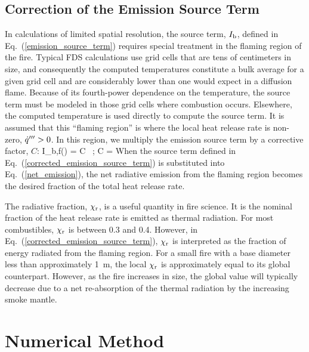 \subsection{Correction of the Emission Source Term}

In calculations of limited spatial resolution, the source term, $I_{\rm b}$,
defined in Eq.~(\ref{emission_source_term}) requires special treatment in the flaming region of the fire. Typical FDS calculations
use grid cells that are tens of centimeters in size, and consequently the computed temperatures constitute a bulk average for a given grid cell and are considerably lower than
one would expect in a diffusion flame.
Because of its fourth-power dependence on the temperature,
the source term must be modeled in those grid cells where combustion occurs. Elsewhere, the computed temperature is used directly to compute the source term.
It is assumed that this ``flaming region'' is where the local heat release rate is non-zero, $\dot{q}'''>0$. In this region, we
multiply the emission source term by a corrective factor, $C$:
\be I_{\rm b,f}(\bx) = C \,    \quad ; \quad
    C =  \label{corrected_emission_source_term}
\ee
When the source term defined in Eq.~(\ref{corrected_emission_source_term}) is
substituted into Eq.~(\ref{net_emission}), the net radiative emission from the flaming region becomes the desired fraction of the total heat release rate.

The radiative
fraction, $\chi_{\rm r}$, is a useful quantity in fire science. It is the nominal fraction of the heat release rate is emitted as thermal radiation. For most combustibles, $\chi_{\rm r}$
is between 0.3 and 0.4. However, in Eq.~(\ref{corrected_emission_source_term}), $\chi_{\rm r}$ is
interpreted as the fraction of energy radiated from the flaming
region.  For a small fire with a base diameter less than approximately 1~m, the local $\chi_{\rm r}$ is
approximately equal to its global counterpart. However, as the fire
increases in size, the global value will typically decrease due to a
net re-absorption of the thermal radiation by the increasing smoke
mantle.


\section{Numerical Method}
\label{radnumericalmethodsection}

